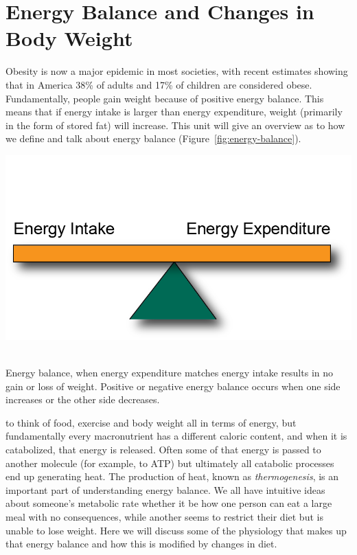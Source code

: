 \documentclass{tufte-handout}
\begin{document}
\section{Energy Balance and Changes in Body Weight}

Obesity is now a major epidemic in most societies, with recent estimates showing that in America 38\% of adults and 17\% of children are considered obese\citep{Flegal2016,Ogden2016}.  Fundamentally, people gain weight because of positive energy balance.  This means that if energy intake is larger than energy expenditure, weight (primarily in the form of stored fat) will increase.  This unit will give an overview as to how we define and talk about energy balance (Figure~\ref{fig:energy-balance}).

\begin{marginfigure}
\includegraphics{figures/Energy-Balance.png}\
\caption{Energy balance, when energy expenditure matches energy intake results in no gain or loss of weight.  Positive or negative energy balance occurs when one side increases or the other side decreases.}\label{fig:energy-balance}
\end{marginfigure}

 to think of food, exercise and body weight all in terms of energy, but fundamentally every macronutrient has a different caloric content, and when it is catabolized, that energy is released.  Often some of that energy is passed to another molecule (for example, to ATP) but ultimately all catabolic processes end up generating heat.  The production of heat, known as \emph{thermogenesis}, is an important part of understanding energy balance.  We all have intuitive ideas about someone's metabolic rate whether it be how one person can eat a large meal with no consequences, while another seems to restrict their diet but is unable to lose weight.  Here we will discuss some of the physiology that makes up that energy balance and how this is modified by changes in diet.
\end{document}
